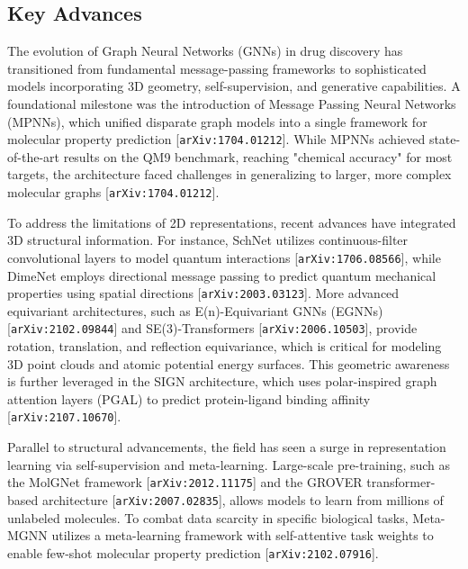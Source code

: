 \documentclass[11pt]{article}
\begin{document}
\subsection{Key Advances}

The evolution of Graph Neural Networks (GNNs) in drug discovery has transitioned from fundamental message-passing frameworks to sophisticated models incorporating 3D geometry, self-supervision, and generative capabilities. A foundational milestone was the introduction of Message Passing Neural Networks (MPNNs), which unified disparate graph models into a single framework for molecular property prediction [\texttt{arXiv:1704.01212}]. While MPNNs achieved state-of-the-art results on the QM9 benchmark, reaching "chemical accuracy" for most targets, the architecture faced challenges in generalizing to larger, more complex molecular graphs [\texttt{arXiv:1704.01212}].

To address the limitations of 2D representations, recent advances have integrated 3D structural information. For instance, SchNet utilizes continuous-filter convolutional layers to model quantum interactions [\texttt{arXiv:1706.08566}], while DimeNet employs directional message passing to predict quantum mechanical properties using spatial directions [\texttt{arXiv:2003.03123}]. More advanced equivariant architectures, such as E(n)-Equivariant GNNs (EGNNs) [\texttt{arXiv:2102.09844}] and SE(3)-Transformers [\texttt{arXiv:2006.10503}], provide rotation, translation, and reflection equivariance, which is critical for modeling 3D point clouds and atomic potential energy surfaces. This geometric awareness is further leveraged in the SIGN architecture, which uses polar-inspired graph attention layers (PGAL) to predict protein-ligand binding affinity [\texttt{arXiv:2107.10670}].

Parallel to structural advancements, the field has seen a surge in representation learning via self-supervision and meta-learning. Large-scale pre-training, such as the MolGNet framework [\texttt{arXiv:2012.11175}] and the GROVER transformer-based architecture [\texttt{arXiv:2007.02835}], allows models to learn from millions of unlabeled molecules. To combat data scarcity in specific biological tasks, Meta-MGNN utilizes a meta-learning framework with self-attentive task weights to enable few-shot molecular property prediction [\texttt{arXiv:2102.07916}].
\end{document}
